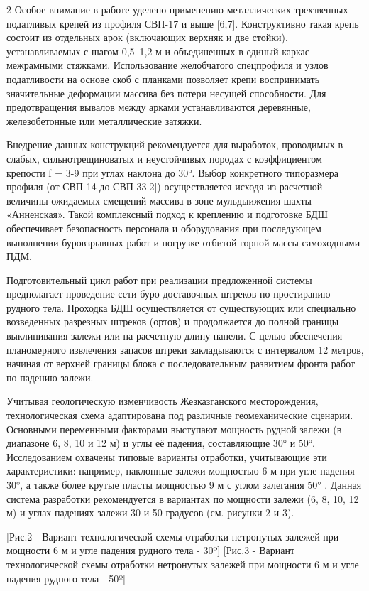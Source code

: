 \begin{multicols}{2}
Особое внимание в работе уделено применению металлических трехзвенных
податливых крепей из профиля СВП-17 и выше {[}6,7{]}. Конструктивно
такая крепь состоит из отдельных арок (включающих верхняк и две стойки),
устанавливаемых с шагом 0,5--1,2 м и объединенных в единый каркас
межрамными стяжками. Использование желобчатого спецпрофиля и узлов
податливости на основе скоб с планками позволяет крепи воспринимать
значительные деформации массива без потери несущей способности. Для
предотвращения вывалов между арками устанавливаются деревянные,
железобетонные или металлические затяжки.

Внедрение данных конструкций рекомендуется для выработок, проводимых в
слабых, сильнотрещиноватых и неустойчивых породах с коэффициентом
крепости f = 3-9 при углах наклона до 30°. Выбор конкретного типоразмера
профиля (от СВП-14 до СВП-33{[}2{]}) осуществляется исходя из расчетной
величины ожидаемых смещений массива в зоне мульдыижения шахты
«Анненская». Такой комплексный подход к креплению и подготовке БДШ
обеспечивает безопасность персонала и оборудования при последующем
выполнении буровзрывных работ и погрузке отбитой горной массы
самоходными ПДМ.

Подготовительный цикл работ при реализации предложенной системы
предполагает проведение сети буро-доставочных штреков по простиранию
рудного тела. Проходка БДШ осуществляется от существующих или специально
возведенных разрезных штреков (ортов) и продолжается до полной границы
выклинивания залежи или на расчетную длину панели. С целью обеспечения
планомерного извлечения запасов штреки закладываются с интервалом 12
метров, начиная от верхней границы блока с последовательным развитием
фронта работ по падению залежи.

Учитывая геологическую изменчивость Жезказганского месторождения,
технологическая схема адаптирована под различные геомеханические
сценарии. Основными переменными факторами выступают мощность рудной
залежи (в диапазоне 6, 8, 10 и 12 м) и углы её падения, составляющие 30°
и 50°. Исследованием охвачены типовые варианты отработки, учитывающие
эти характеристики: например, наклонные залежи мощностью 6 м при угле
падения 30°, а также более крутые пласты мощностью 9 м с углом залегания
50° . Данная система разработки рекомендуется в вариантах по мощности
залежи (6, 8, 10, 12 м) и углах падениях залежи 30 и 50 градусов (см.
рисунки 2 и 3).
\end{multicols}

\begin{figs}
[Рис.2 - Вариант технологической схемы отработки
нетронутых залежей при мощности 6 м и угле падения рудного тела - 30º]
[Рис.3 - Вариант технологической схемы отработки нетронутых
залежей при мощности 6 м и угле падения рудного тела - 50º]
\end{figs}

